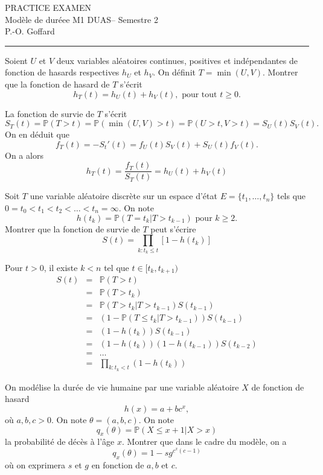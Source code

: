 \documentclass[11pt, answers]{exam}
\def\semester{Semestre 2}
\def\course{Modèle de duréee M1 DUAS}
\def\name{P.-O. Goffard}
\def\title{\MakeUppercase{Practice Examen}}
\newcommand*{\Prob}{\mathbb{P}}
\begin{document}
{\center \textsc{\Large\title}\\
	\vspace*{1em}
	\course -- \semester\\
	\name\\
	\vspace*{2em}
	\hrule
\vspace*{2em}}

\begin{questions}

\question Soient $U$ et $V$ deux variables aléatoires continues, positives et indépendantes de fonction de hasards respectives $h_U$ et $h_V$. On définit $T=\min(U,V)$. Montrer que la fonction de hasard de $T$ s'écrit 
$$
h_T(t) = h_U(t) + h_V(t),\text{ pour tout }t\geq 0.
$$
\begin{solution}
La fonction de survie de $T$ s'écrit
$$
S_T(t)=\Prob(T>t) = \Prob(\min(U,V)>t) = \Prob(U>t, V>t) = S_U(t)S_V(t).
$$
On en déduit que 
$$
f_T(t) = -S_t'(t) = f_U(t)S_V(t) + S_U(t)f_V(t).
$$
On a alors 
$$
h_T(t)=\frac{f_T(t)}{S_T(t)} = h_U(t) + h_V(t)
$$
\end{solution}
\question Soit $T$ une variable aléatoire discrète sur un espace d'état $E = \{t_1,\ldots, t_n\}$ tels que 
$0=t_0<t_1<t_2<\ldots < t_n = \infty$. On note 
$$
h(t_k) = \Prob(T = t_k|T>t_{k-1})\text{ pour }k\geq 2.
$$
Montrer que la fonction de survie de $T$ peut s'écrire
$$
S(t) = \prod_{k:t_k\leq t}[1-h(t_k)]
$$
\begin{solution}
Pour $t>0$, il existe $k<n$ tel que $t\in[t_k,t_{k+1})$
\begin{eqnarray*}
S(t)&=& \Prob(T>t)\\
&=&\Prob(T>t_k)\\
&=&\Prob(T>t_k|T>t_{k-1})S(t_{k-1})\\
&=&(1-\Prob(T\leq t_k|T>t_{k-1}))S(t_{k-1})\\
&=&(1-h(t_k))S(t_{k-1})\\
&=&(1-h(t_k))(1-h(t_{k-1}))S(t_{k-2})\\
&=&\ldots\\
&=&\prod_{k:t_k<t}(1-h(t_{k}))
\end{eqnarray*}
\end{solution}
\question On modélise la durée de vie humaine par une variable aléatoire $X$ de fonction de hasard
$$
h(x) = a+bc^x,
$$
où $a,b,c>0$. On note $\theta = (a,b,c)$. On note 
$$
q_{x}(\theta) = \Prob(X\leq x+1 |X> x)
$$
la probabilité de décès à l'âge $x$. Montrer que dans le cadre du modèle, on a 
$$
q_{x}(\theta) = 1-sg^{c^x(c-1)}
$$
où on exprimera $s$ et $g$ en fonction de $a, b$ et $c$.

\end{questions}
\end{document}
